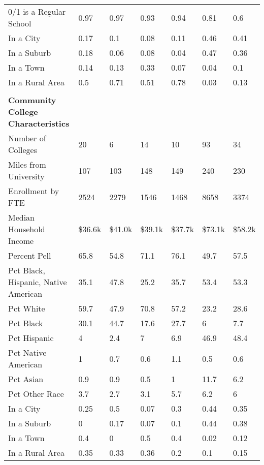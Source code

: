 \begin{longtabu}{X[4.5,l] X[1,c] X[1,c] X[1,c] X[1,c] X[1,c] X[1,c]}
\hspace{0.4cm}0/1 is a Regular School&0.97&0.97&0.93&0.94&0.81&0.6\\%
\hspace{0.4cm}In a City&0.17&0.1&0.08&0.11&0.46&0.41\\%
\hspace{0.4cm}In a Suburb&0.18&0.06&0.08&0.04&0.47&0.36\\%
\hspace{0.4cm}In a Town&0.14&0.13&0.33&0.07&0.04&0.1\\%
\hspace{0.4cm}In a Rural Area&0.5&0.71&0.51&0.78&0.03&0.13\\%
&&&&&&\\%
\textbf{Community College Characteristics}&\textbf{}&\textbf{}&\textbf{}&\textbf{}&\textbf{}&\textbf{}\\%
\hspace{0.4cm}Number of Colleges&20&6&14&10&93&34\\%
\hspace{0.4cm}Miles from University&107&103&148&149&240&230\\%
\hspace{0.4cm}Enrollment by FTE&2524&2279&1546&1468&8658&3374\\%
\hspace{0.4cm}Median Household Income&\$36.6k&\$41.0k&\$39.1k&\$37.7k&\$73.1k&\$58.2k\\%
\hspace{0.4cm}Percent Pell&65.8&54.8&71.1&76.1&49.7&57.5\\%
\hspace{0.4cm}Pct Black, Hispanic, Native American&35.1&47.8&25.2&35.7&53.4&53.3\\%
\hspace{0.4cm}Pct White&59.7&47.9&70.8&57.2&23.2&28.6\\%
\hspace{0.4cm}Pct Black&30.1&44.7&17.6&27.7&6&7.7\\%
\hspace{0.4cm}Pct Hispanic&4&2.4&7&6.9&46.9&48.4\\%
\hspace{0.4cm}Pct Native American&1&0.7&0.6&1.1&0.5&0.6\\%
\hspace{0.4cm}Pct Asian&0.9&0.9&0.5&1&11.7&6.2\\%
\hspace{0.4cm}Pct Other Race&3.7&2.7&3.1&5.7&6.2&6\\%
\hspace{0.4cm}In a City&0.25&0.5&0.07&0.3&0.44&0.35\\%
\hspace{0.4cm}In a Suburb&0&0.17&0.07&0.1&0.44&0.38\\%
\hspace{0.4cm}In a Town&0.4&0&0.5&0.4&0.02&0.12\\%
\hspace{0.4cm}In a Rural Area&0.35&0.33&0.36&0.2&0.1&0.15\\%
\end{longtabu}
